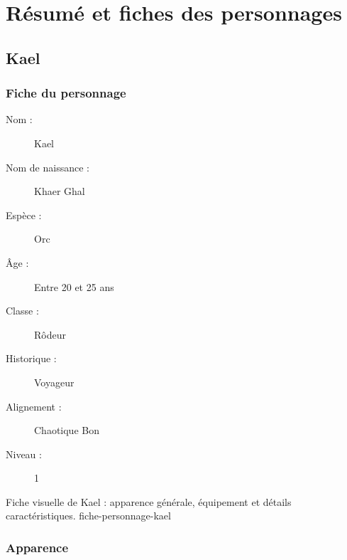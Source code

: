 \chapter*{Résumé et fiches des personnages}
{}
\label{chap:resume-personnages}


\section*{Kael}
{}
\label{sec:fiche-kael}

\subsection*{Fiche du personnage}

\begin{description}
    \item[Nom :] Kael
    \item[Nom de naissance :] Khaer Ghal
    \item[Espèce :] Orc
    \item[Âge :] Entre 20 et 25 ans
    \item[Classe :] Rôdeur
    \item[Historique :] Voyageur
    \item[Alignement :] Chaotique Bon
    \item[Niveau :] 1
\end{description}

  {Fiche visuelle de Kael : apparence générale, équipement et détails caractéristiques.}
  {fiche-personnage-kael}

%
%

\subsection*{Apparence}

